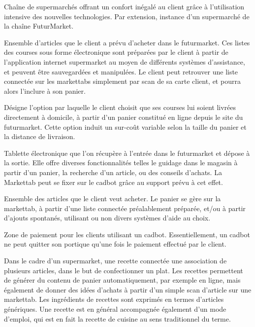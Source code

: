 Chaîne de supermarchés offrant un confort inégalé au client grâce à l'utilisation intensive des nouvelles technologies.
Par extension, instance d'un supermarché de la chaîne FuturMarket.

Ensemble d'articles que le client a prévu d'acheter dans le futurmarket.
Ces listes des courses sous forme électronique sont préparées par le client à partir de l'application internet supermarket au moyen de différents systèmes d'assistance, et peuvent être sauvegardées et manipulées. 
Le client peut retrouver une liste connectée sur les markettabs simplement par scan de sa carte client, et pourra alors l'inclure à son panier.

Désigne l'option par laquelle le client choisit que ses courses lui soient livrées directement à domicile, à partir d'un panier constitué en ligne depuis le site du futurmarket.
Cette option induit un sur-coût variable selon la taille du panier et la distance de livraison.

Tablette électronique que l'on récupère à l'entrée dans le futurmarket et dépose à la sortie.
Elle offre diverses fonctionnalités telles le guidage dans le magasin à partir d'un panier, la recherche d'un article, ou des conseils d'achats.
La Markettab peut se fixer sur le cadbot grâce au support prévu à cet effet.

Ensemble des articles que le client veut acheter.
Le panier se gère sur la markettab, à partir d'une liste connectée préalablement préparée, et/ou à partir d'ajouts spontanés, utilisant ou non divers systèmes d'aide au choix.

Zone de paiement pour les clients utilisant un cadbot.
Essentiellement, un cadbot ne peut quitter son portique qu'une fois le paiement effectué par le client.

Dans le cadre d'un supermarket, une recette connectée une association de plusieurs articles, dans le but de confectionner un plat. 
Les recettes permettent de générer du contenu de panier automatiquement, par exemple en ligne, mais également de donner des idées d'achats à partir d'un simple scan d'article sur une markettab.
Les ingrédients de recettes sont exprimés en termes d'articles génériques.
Une recette est en général accompagnée également d'un mode d'emploi, qui est en fait la recette de cuisine au sens traditionnel du terme.

